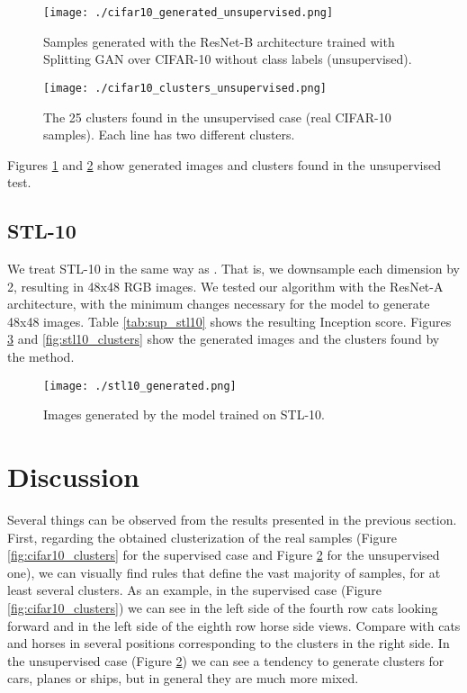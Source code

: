 \documentclass[times,twocolumn]{article}
\begin{document}
\begin{figure}
 \centering
 \texttt{[image: ./cifar10\_generated\_unsupervised.png]}
 \caption{Samples generated with the ResNet-B architecture trained with Splitting GAN over CIFAR-10 without class labels (unsupervised).}
 \label{fig:cifar10_generated_unsupervised}
\end{figure}


\begin{figure}
 \centering
 \texttt{[image: ./cifar10\_clusters\_unsupervised.png]}
\caption{The 25 clusters found in the unsupervised case (real CIFAR-10 samples). Each line has two different clusters.}
\label{fig:cifar10_clusters_unsupervised}
\end{figure}


Figures \ref{fig:cifar10_generated_unsupervised} and \ref{fig:cifar10_clusters_unsupervised} show generated images and clusters found in the unsupervised test.

\subsection{STL-10}
We treat STL-10 in the same way as \cite{WardeFarley2017}. That is, we downsample each dimension by 2, resulting in 48x48 RGB images. We tested our algorithm with the ResNet-A architecture, with the minimum changes necessary for the model to generate 48x48 images. Table \ref{tab:sup_stl10} shows the resulting Inception score.
Figures \ref{fig:stl10_generated} and \ref{fig:stl10_clusters} show the generated images and the clusters found by the method.

\begin{figure}
 \centering
 \texttt{[image: ./stl10\_generated.png]}
\caption{Images generated by the model trained on STL-10.}
\label{fig:stl10_generated}
\end{figure}

\section{Discussion}
Several things can be observed from the results presented in the previous section.
First, regarding the obtained clusterization of the real samples (Figure \ref {fig:cifar10_clusters} for the supervised case and Figure \ref{fig:cifar10_clusters_unsupervised} for the unsupervised one), we can visually find rules that define the vast majority of samples, for at least several clusters.
As an example, in the supervised case (Figure \ref{fig:cifar10_clusters}) we can see in the left side of the fourth row cats looking forward and in the left side of the eighth row horse side views. Compare with cats and horses in several positions corresponding to the clusters in the right side.
In the unsupervised case (Figure \ref{fig:cifar10_clusters_unsupervised}) we can see a tendency to generate clusters for cars, planes or ships, but in general they are much more mixed.
\end{document}
